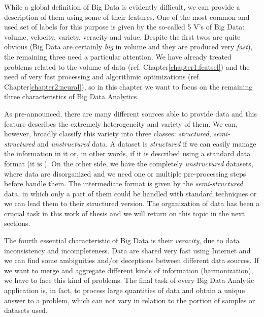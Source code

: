 \documentclass{standalone}
\begin{document}
While a global definition of Big Data is evidently difficult, we can provide a description of them using some of their  features.
One of the most common and used set of labels for this purpose is given by the so-called 5 V's of Big Data: volume, velocity, variety, veracity and value.
Despite the first twos are quite obvious (Big Data are certainly \emph{big} in volume and they are produced very \emph{fast}), the remaining three need a particular attention.
We have already treated problems related to the volume of data (ref. Chapter\ref{chapter1:featsel}) and the need of very fast processing and algorithmic optimizations (ref. Chapter\ref{chapter2:neural}), so in this chapter we want to focus on the remaining three characteristics of Big Data Analytics.

As pre-announced, there are many different sources able to provide data and this feature describes the extremely heterogeneity and variety of them.
We can, however, broadly classify this variety into three classes: \emph{structured}, \emph{semi-structured} and \emph{unstructured} data.
A dataset is \emph{structured} if we can easily manage the information in it or, in other words, if it is described using a standard data format (it is ).
On the other side, we have the completely \emph{unstructured} datasets, where data are disorganized and we need one or multiple pre-processing steps before handle them.
The intermediate format is given by the \emph{semi-structured} data, in which only a part of them could be handled with standard techniques or we can lead them to their structured version.
The organization of data has been a crucial task in this work of thesis and we will return on this topic in the next sections.

The fourth essential characteristic of Big Data is their \emph{veracity}, due to data inconsistency and incompleteness.
Data are shared very fast using Internet and we can find some ambiguities and/or deceptions between different data sources.
If we want to merge and aggregate different kinds of information (harmonization), we have to face this kind of problems.
The final task of every Big Data Analytic application is, in fact, to process large quantities of data and obtain a unique answer to a problem, which can not vary in relation to the portion of samples or datasets used.
\end{document}
